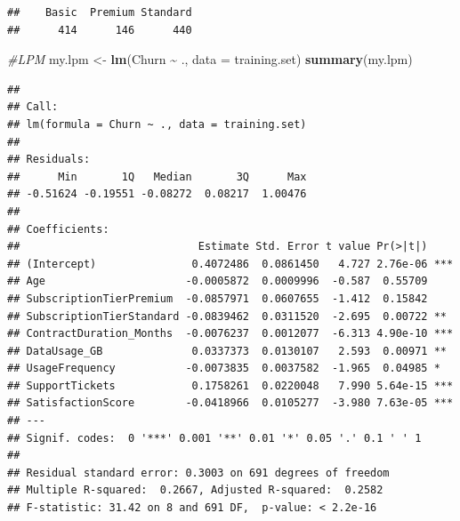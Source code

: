 \documentclass[
]{article}
\newenvironment{Shaded}{\begin{snugshade}}{\end{snugshade}}
\newcommand{\AttributeTok}[1]{\textcolor[rgb]{0.13,0.29,0.53}{#1}}
\newcommand{\CommentTok}[1]{\textcolor[rgb]{0.56,0.35,0.01}{\textit{#1}}}
\newcommand{\FunctionTok}[1]{\textcolor[rgb]{0.13,0.29,0.53}{\textbf{#1}}}
\newcommand{\NormalTok}[1]{#1}
\newcommand{\OtherTok}[1]{\textcolor[rgb]{0.56,0.35,0.01}{#1}}
\newcommand{\SpecialCharTok}[1]{\textcolor[rgb]{0.81,0.36,0.00}{\textbf{#1}}}
\begin{document}
\begin{Shaded}
\end{Shaded}

\begin{verbatim}
##    Basic  Premium Standard 
##      414      146      440
\end{verbatim}

\begin{Shaded}
\begin{Highlighting}[]
\CommentTok{\#LPM }
\NormalTok{my.lpm }\OtherTok{\textless{}{-}} \FunctionTok{lm}\NormalTok{(Churn }\SpecialCharTok{\textasciitilde{}}\NormalTok{ ., }\AttributeTok{data =}\NormalTok{ training.set)}
\FunctionTok{summary}\NormalTok{(my.lpm)}
\end{Highlighting}
\end{Shaded}

\begin{verbatim}
## 
## Call:
## lm(formula = Churn ~ ., data = training.set)
## 
## Residuals:
##      Min       1Q   Median       3Q      Max 
## -0.51624 -0.19551 -0.08272  0.08217  1.00476 
## 
## Coefficients:
##                            Estimate Std. Error t value Pr(>|t|)    
## (Intercept)               0.4072486  0.0861450   4.727 2.76e-06 ***
## Age                      -0.0005872  0.0009996  -0.587  0.55709    
## SubscriptionTierPremium  -0.0857971  0.0607655  -1.412  0.15842    
## SubscriptionTierStandard -0.0839462  0.0311520  -2.695  0.00722 ** 
## ContractDuration_Months  -0.0076237  0.0012077  -6.313 4.90e-10 ***
## DataUsage_GB              0.0337373  0.0130107   2.593  0.00971 ** 
## UsageFrequency           -0.0073835  0.0037582  -1.965  0.04985 *  
## SupportTickets            0.1758261  0.0220048   7.990 5.64e-15 ***
## SatisfactionScore        -0.0418966  0.0105277  -3.980 7.63e-05 ***
## ---
## Signif. codes:  0 '***' 0.001 '**' 0.01 '*' 0.05 '.' 0.1 ' ' 1
## 
## Residual standard error: 0.3003 on 691 degrees of freedom
## Multiple R-squared:  0.2667, Adjusted R-squared:  0.2582 
## F-statistic: 31.42 on 8 and 691 DF,  p-value: < 2.2e-16
\end{verbatim}
\end{document}
